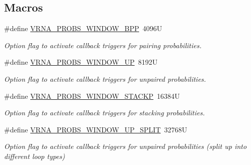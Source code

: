 \subsection*{Macros}
\begin{DoxyCompactItemize}
\item 
\#define \hyperlink{group__local__pf__fold_ga296217b76e76e5f7e6927e7210aa9b1f}{V\+R\+N\+A\+\_\+\+P\+R\+O\+B\+S\+\_\+\+W\+I\+N\+D\+O\+W\+\_\+\+B\+PP}~4096U
\begin{DoxyCompactList}\small\item\em Option flag to activate callback triggers for pairing probabilities. \end{DoxyCompactList}\item 
\#define \hyperlink{group__local__pf__fold_ga18325811c7dfc7b7d9d4ac37f4353615}{V\+R\+N\+A\+\_\+\+P\+R\+O\+B\+S\+\_\+\+W\+I\+N\+D\+O\+W\+\_\+\+UP}~8192U
\begin{DoxyCompactList}\small\item\em Option flag to activate callback triggers for unpaired probabilities. \end{DoxyCompactList}\item 
\#define \hyperlink{group__local__pf__fold_ga0a13fc668b02f21b225e2334e4caac08}{V\+R\+N\+A\+\_\+\+P\+R\+O\+B\+S\+\_\+\+W\+I\+N\+D\+O\+W\+\_\+\+S\+T\+A\+C\+KP}~16384U
\begin{DoxyCompactList}\small\item\em Option flag to activate callback triggers for stacking probabilities. \end{DoxyCompactList}\item 
\#define \hyperlink{group__local__pf__fold_ga9068f4ec008bf1c042a9357f5c2c5e13}{V\+R\+N\+A\+\_\+\+P\+R\+O\+B\+S\+\_\+\+W\+I\+N\+D\+O\+W\+\_\+\+U\+P\+\_\+\+S\+P\+L\+IT}~32768U
\begin{DoxyCompactList}\small\item\em Option flag to activate callback triggers for unpaired probabilities (split up into different loop types) \end{DoxyCompactList}\end{DoxyCompactItemize}
